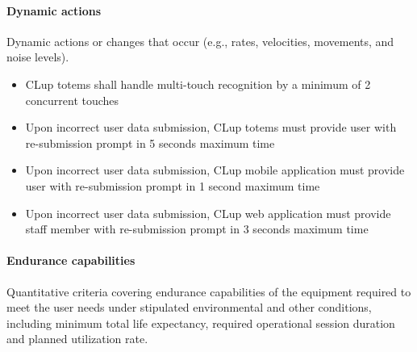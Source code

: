 \paragraph{Dynamic actions}
\label{par:dynamicActions}
Dynamic actions or changes that occur (e.g., rates, velocities, movements, and noise levels).\newline

\begin{itemize}[leftmargin=+.8in]
    \item [\ref{par:dynamicActions}.1.1] CLup totems shall handle multi-touch recognition by a minimum of 2 concurrent touches
    \item [\ref{par:dynamicActions}.1.2] Upon incorrect user data submission, CLup totems must provide user with re-submission prompt in 5 seconds maximum time
    \item [\ref{par:dynamicActions}.1.3] Upon incorrect user data submission, CLup mobile application must provide user with re-submission prompt in 1 second maximum time
    \item [\ref{par:dynamicActions}.1.4] Upon incorrect user data submission, CLup web application must provide staff member with re-submission prompt in 3 seconds maximum time
    
\end{itemize}

\paragraph{Endurance capabilities}
\label{par:endurance}

Quantitative criteria covering endurance capabilities of the equipment required to meet the user needs
under stipulated environmental and other conditions, including minimum total life expectancy, required operational session duration and planned utilization rate.\newline

